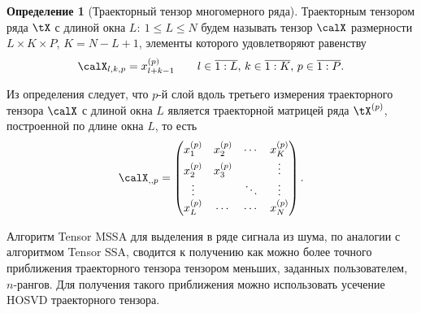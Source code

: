 \documentclass[specialist,
    substylefile = spbu_report.rtx,
    subf,href,colorlinks=true, 12pt]{disser}
\theoremstyle{plain}
\theoremstyle{definition}
\newtheorem{definition}{Определение}[section]
\theoremstyle{remark}
\begin{document}
    \begin{definition}[Траекторный тензор многомерного ряда]
        Траекторным тензором ряда $\tX$ с длиной окна $L:\: 1\leqslant L \leqslant N$ будем называть тензор $\calX$
        размерности ${L \times K \times P}$, ${K = N - L + 1}$, элементы которого удовлетворяют равенству
        \[
            \calX_{l,k,p}=x_{l+k-1}^{(p)} \qquad l \in \overline{1:L},\, k \in \overline{1:K},\, p \in \overline{1:P}.
        \]\label{def:trajectory-tensor-mssa}
    \end{definition}

    Из определения следует, что $p$-й слой вдоль третьего измерения траекторного тензора $\calX$ с длиной окна $L$
    является траекторной матрицей ряда $\tX^{(p)}$, построенной по длине окна $L$, то есть
    \[
        \calX_{,,p} =
        \begin{pmatrix}
            x_1^{(p)} & x_2^{(p)} & \cdots & x_K^{(p)} \\
            x_2^{(p)} & x_3^{(p)} &        & \vdots    \\
            \vdots    &           & \ddots & \vdots    \\
            x_L^{(p)} & \cdots    & \cdots & x_N^{(p)}
        \end{pmatrix}.
    \]

    Алгоритм Tensor MSSA для выделения в ряде сигнала из шума, по аналогии с алгоритмом Tensor SSA,
    сводится к получению как можно более точного приближения траекторного тензора тензором меньших,
    заданных пользователем, $n$-рангов.
    Для получения такого приближения можно использовать усечение HOSVD траекторного тензора.
\end{document}
